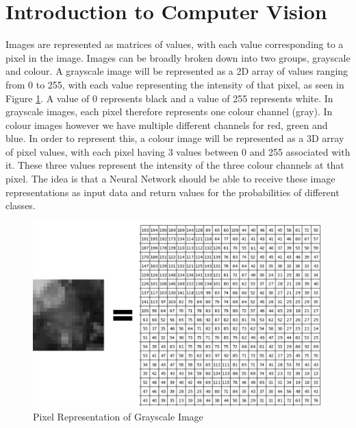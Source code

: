 \documentclass[12pt]{report}
\begin{document}
\section{Introduction to Computer Vision}
\begin{flushleft}
Images are represented as matrices of values, with each value corresponding to a pixel in the image. Images can be broadly broken down into two groups, grayscale and colour. A grayscale image will be represented as a 2D array of values ranging from 0 to 255, with each value representing the intensity of that pixel, as seen in Figure \ref{fig:pixels}. A value of 0 represents black and a value of 255 represents white. In grayscale images, each pixel therefore represents one colour channel (gray). In colour images however we have multiple different channels for red, green and blue. In order to represent this, a colour image will be represented as a 3D array of pixel values, with each pixel having 3 values between 0 and 255 associated with it. These three values represent the intensity of the three colour channels at that pixel. The idea is that a Neural Network should be able to receive these image representations as input data and return values for the probabilities of different classes.
\end{flushleft}

\vspace{0.5cm}
\begin{figure}[ht!]
	\centering
	\includegraphics[width=12cm]{pixels}
	\caption{Pixel Representation of Grayscale Image}
	\label{fig:pixels}
\end{figure}

\newpage
\end{document}
